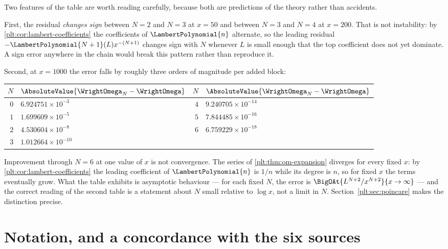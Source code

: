 \documentclass[11pt,oneside]{article}
\theoremstyle{plain}
\theoremstyle{definition}
\theoremstyle{remark}
\newcommand{\LamP}[1]{\LambertPolynomial{#1}}
\begin{document}
Two features of the table are worth reading carefully, because both are
predictions of the theory rather than accidents.

First, the residual \emph{changes sign} between \(N=2\) and \(N=3\) at
\(x=50\) and between \(N=3\) and \(N=4\) at \(x=200\).  That is not
instability: by \cref{plt:cor:lambert-coefficients} the coefficients of
\(\LamP{n}\) alternate, so the leading residual
\(-\LamP{N+1}(L)x^{-(N+1)}\) changes sign with \(N\) whenever \(L\) is small
enough that the top coefficient does not yet dominate.  A sign error anywhere
in the chain would break this pattern rather than reproduce it.

Second, at \(x=1000\) the error falls by roughly three orders of magnitude per
added block:

\begin{center}\small
\begin{tabular}{@{}r l r l@{}}
\toprule
\(N\) & \(\AbsoluteValue{\WrightOmega_{N}-\WrightOmega}\) &
\(N\) & \(\AbsoluteValue{\WrightOmega_{N}-\WrightOmega}\)\\
\midrule
$0$ & $6.924751\times10^{-3}$  & $4$ & $9.240705\times10^{-14}$\\
$1$ & $1.699609\times10^{-5}$  & $5$ & $7.844485\times10^{-16}$\\
$2$ & $4.530604\times10^{-8}$  & $6$ & $6.759229\times10^{-18}$\\
$3$ & $1.012664\times10^{-10}$ & & \\
\bottomrule
\end{tabular}
\end{center}

\begin{warningbox}[title={What this table does \emph{not} show}]
\label{plt:rmk:numeric-not-convergence}
Improvement through \(N=6\) at one value of \(x\) is not convergence.  The
series of \cref{plt:thm:om-expansion} diverges for every fixed \(x\): by
\cref{plt:cor:lambert-coefficients} the leading coefficient of \(\LamP{n}\) is
\(1/n\) while its degree is \(n\), so for fixed \(x\) the terms eventually
grow.  What the table exhibits is asymptotic behaviour --- for each fixed
\(N\), the error is \(\BigOAt{L^{N+2}/x^{N+2}}{x\to\infty}\) --- and the
correct reading of the second table is a statement about \(N\) small relative
to \(\log x\), not a limit in \(N\).  Section~\ref{plt:sec:poincare} makes the
distinction precise.
\end{warningbox}

\section{Notation, and a concordance with the six sources}
\label{plt:sec:notation}
\end{document}
